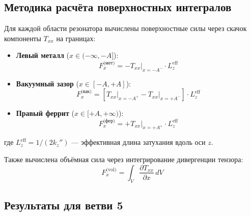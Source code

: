 \documentclass[a4paper,12pt]{article}
\begin{document}
\subsection{Методика расчёта поверхностных интегралов}

Для каждой области резонатора вычислены поверхностные силы через скачок
компоненты $T_{xx}$ на границах:

\begin{itemize}
    \item \textbf{Левый металл} ($x \in (-\infty, -A]$):
    \begin{equation}
    F_x^{\text{(мет)}} = -T_{xx}\big|_{x=-A^-} \cdot L_z^{\text{eff}}
    \end{equation}

    \item \textbf{Вакуумный зазор} ($x \in [-A, +A]$):
    \begin{equation}
    F_x^{\text{(вак)}} = \left[T_{xx}\big|_{x=-A^+} - T_{xx}\big|_{x=+A^-}\right] \cdot L_z^{\text{eff}}
    \end{equation}

    \item \textbf{Правый феррит} ($x \in [+A, +\infty)$):
    \begin{equation}
    F_x^{\text{(фер)}} = +T_{xx}\big|_{x=+A^+} \cdot L_z^{\text{eff}}
    \end{equation}
\end{itemize}

где $L_z^{\text{eff}} = 1/(2k_z'')$ --- эффективная длина затухания вдоль оси $z$.

Также вычислена объёмная сила через интегрирование дивергенции тензора:
\begin{equation}
F_x^{\text{(vol)}} = \int_V \frac{\partial T_{xx}}{\partial x}\,dV
\label{eq:volume_integral}
\end{equation}

\subsection{Результаты для ветви 5}
\end{document}
